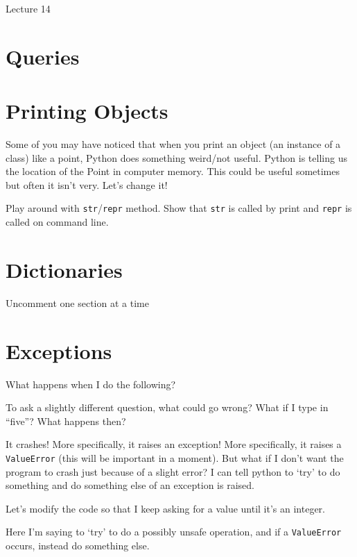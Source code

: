 \documentclass[12pt]{article}
\begin{document}
\begin{center}
   \LARGE Lecture 14
\end{center}

\section*{Queries}

\section{Printing Objects}

Some of you may have noticed that when you print an object (an instance of a
class) like a point, Python does something weird/not useful.  Python is telling
us the location of the Point in computer memory.  This could be useful
sometimes but often it isn't very.  Let's change it!



\noindent
Play around with \lstinline{str}/\lstinline{repr} method.  Show that
\lstinline{str} is called by print and \lstinline{repr} is called on command
line.

\section{Dictionaries}

Uncomment one section at a time



\section{Exceptions}

What happens when I do the following?



\noindent
To ask a slightly different question, what could go wrong?  What if I type in
``five''?  What happens then?

It crashes!  More specifically, it raises an exception!  More specifically, it
raises a \lstinline{ValueError} (this will be important in a moment).  But what
if I don't want the program to crash just because of a slight error?  I can
tell python to `try' to do something and do something else of an exception is
raised.



\noindent
Let's modify the code so that I keep asking for a value until it's an integer.



\noindent
Here I'm saying to `try' to do a possibly unsafe operation, and if a
\lstinline{ValueError} occurs, instead do something else.
\end{document}

